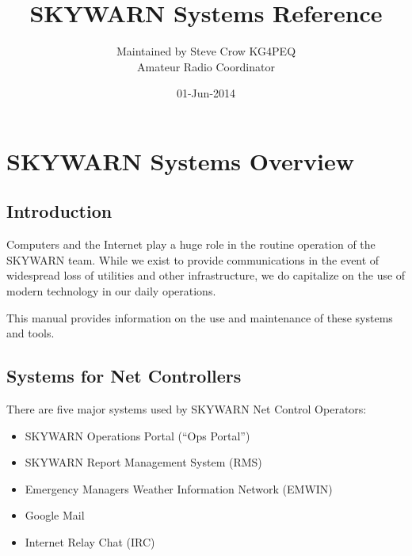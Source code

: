 \documentclass[pdflatex,letterpaper,twoside,12pt]{book}
\title             {SKYWARN Systems Reference}
\author            {Maintained by Steve Crow KG4PEQ\\Amateur Radio Coordinator}
\date              {01-Jun-2014}
\begin{document}
\skywarnTitlePage
\skipToTOC
\skywarnTOC


\chapter{SKYWARN Systems Overview}


\section{Introduction}

Computers and the Internet play a huge role in the routine operation of the SKYWARN team.  While we exist to provide communications in the event of widespread loss of utilities and other infrastructure, we do capitalize on the use of modern technology in our daily operations.

This manual provides information on the use and maintenance of these systems 
and tools.


\section{Systems for Net Controllers}\label{nco-systems}

There are five major systems used by SKYWARN Net Control Operators:

\begin{itemize}
\item SKYWARN Operations Portal (``Ops Portal'')
\item SKYWARN Report Management System (RMS)
\item Emergency Managers Weather Information Network (EMWIN)
\item Google Mail
\item Internet Relay Chat (IRC)
\end{itemize}
\end{document}
